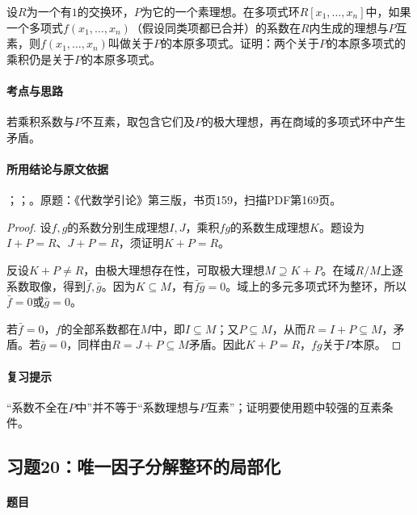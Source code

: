设$R$为一个有$1$的交换环，$P$为它的一个素理想。在多项式环$R[x_1,\ldots,x_n]$中，如果一个多项式$f(x_1,\ldots,x_n)$（假设同类项都已合并）的系数在$R$内生成的理想与$P$互素，则$f(x_1,\ldots,x_n)$叫做关于$P$的本原多项式。证明：两个关于$P$的本原多项式的乘积仍是关于$P$的本原多项式。

\paragraph{考点与思路}

若乘积系数与$P$不互素，取包含它们及$P$的极大理想，再在商域的多项式环中产生矛盾。

\paragraph{所用结论与原文依据}

；；。原题：《代数学引论》第三版，书页159，扫描PDF第169页。


\begin{proof}

设$f,g$的系数分别生成理想$I,J$，乘积$fg$的系数生成理想$K$。题设为$I+P=R$、$J+P=R$，须证明$K+P=R$。

反设$K+P\ne R$，由极大理想存在性，可取极大理想$M\supseteq K+P$。在域$R/M$上逐系数取像，得到$\bar f,\bar g$。因为$K\subseteq M$，有$\bar f\bar g=0$。域上的多元多项式环为整环，所以$\bar f=0$或$\bar g=0$。

若$\bar f=0$，$f$的全部系数都在$M$中，即$I\subseteq M$；又$P\subseteq M$，从而$R=I+P\subseteq M$，矛盾。若$\bar g=0$，同样由$R=J+P\subseteq M$矛盾。因此$K+P=R$，$fg$关于$P$本原。

\end{proof}

\paragraph{复习提示}

“系数不全在$P$中”并不等于“系数理想与$P$互素”；证明要使用题中较强的互素条件。

\subsection{习题20：唯一因子分解整环的局部化}

\label{ex:4:20}

\paragraph{题目}

